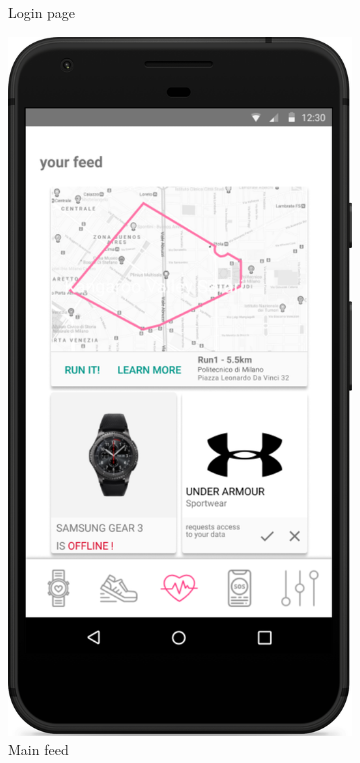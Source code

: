 \documentclass[../main.tex]{subfiles}
\begin{document}
\begin{figure}[H]
\begin{subfigure}[b]{0.45\linewidth}
		\caption{Login page}
		\label{mock_login}
	\end{subfigure}
	\begin{subfigure}[b]{0.45\linewidth}
		\includegraphics[width=\linewidth]{images/mockup/MainFeed.png}
		\caption{Main feed}
		\label{mock_mainfeed}
	\end{subfigure}
	\caption{}
\end{figure}
\end{document}
